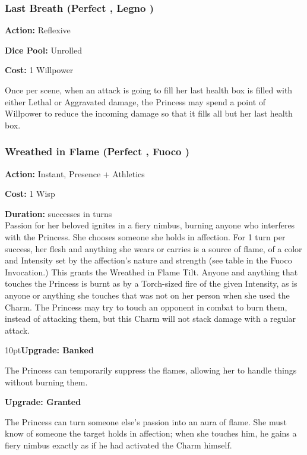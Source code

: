 \subsubsection*{Last Breath (Perfect \textbullet\textbullet, Legno \textbullet\textbullet)}

\noindent \textbf{Action:} Reflexive

\noindent \textbf{Dice Pool:} Unrolled

\noindent \textbf{Cost:} 1 Willpower 

Once per scene, when an attack is going to fill her last health box is filled with either Lethal or Aggravated damage, the Princess may spend a point of Willpower to reduce the incoming damage so that it fills all but her last health box. 

\subsubsection*{Wreathed in Flame (Perfect \textbullet\textbullet, Fuoco \textbullet)}

\noindent \textbf{Action:} Instant, Presence + Athletics

\noindent \textbf{Cost:} 1 Wisp

\noindent \textbf{Duration:} successes in turns \\

\noindent Passion for her beloved ignites in a fiery nimbus, burning anyone who interferes with the Princess. She chooses someone she holds in affection. For 1 turn per success, her flesh and anything she wears or carries is a source of flame, of a color and Intensity set by the affection's nature and strength (see table in the Fuoco Invocation.) This grants the Wreathed in Flame Tilt.  Anyone and anything that touches the Princess is burnt as by a Torch-sized fire of the given Intensity, as is anyone or anything she touches that was not on her person when she used the Charm. The Princess may try to touch an opponent in combat to burn them, instead of attacking them, but this Charm will not stack damage with a regular attack. 

\begin{myindentpar}{10pt}\textbf{Upgrade: Banked}

The Princess can temporarily suppress the flames, allowing her to handle things without burning them. 

\textbf{Upgrade: Granted}

The Princess can turn someone else's passion into an aura of flame. She must know of someone the target holds in affection; when she touches him, he gains a fiery nimbus exactly as if he had activated the Charm himself.\end{myindentpar}

